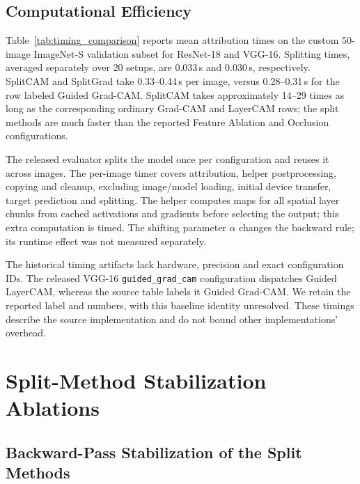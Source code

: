 \subsection{Computational Efficiency}\label{app:p1_timing}

Table~\ref{tab:timing_comparison} reports mean attribution times on the custom 50-image ImageNet-S validation subset for ResNet-18 and VGG-16. Splitting times, averaged separately over 20 setups, are 0.033\,s and 0.030\,s, respectively. SplitCAM and SplitGrad take 0.33--0.44\,s per image, versus 0.28--0.31\,s for the row labeled Guided Grad-CAM. SplitCAM takes approximately 14--29 times as long as the corresponding ordinary Grad-CAM and LayerCAM rows; the split methods are much faster than the reported Feature Ablation and Occlusion configurations.

The released evaluator splits the model once per configuration and reuses it across images. The per-image timer covers attribution, helper postprocessing, copying and cleanup, excluding image/model loading, initial device transfer, target prediction and splitting. The helper computes maps for all spatial layer chunks from cached activations and gradients before selecting the output; this extra computation is timed. The shifting parameter $\alpha$ changes the backward rule; its runtime effect was not measured separately.

The historical timing artifacts lack hardware, precision and exact configuration IDs. The released VGG-16 \texttt{guided\_grad\_cam} configuration dispatches Guided LayerCAM, whereas the source table labels it Guided Grad-CAM. We retain the reported label and numbers, with this baseline identity unresolved. These timings describe the source implementation and do not bound other implementations' overhead.



\FloatBarrier


\section{Split-Method Stabilization Ablations}\label{sec:ablations}
\subsection{Backward-Pass Stabilization of the Split Methods}\label{subsec:alpha_ablation}

